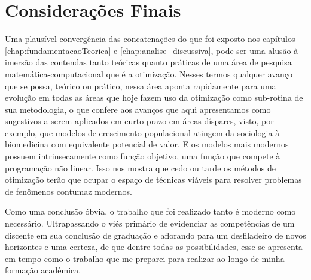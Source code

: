 \section{Considerações Finais}
\label{sec:consideracoesFinais}

Uma plausível convergência das concatenações do que foi exposto nos capítulos
\ref{chap:fundamentacaoTeorica} e \ref{chap:analise_discussiva}, pode ser uma
alusão à imersão das contendas tanto teóricas quanto práticas de uma área de
pesquisa matemática-computacional que é a otimização. Nesses termos qualquer
avanço que se possa, teórico ou prático, nessa área aponta rapidamente para
uma evolução em todas as áreas que hoje fazem uso da otimização como
sub-rotina de sua metodologia, o que confere aos avanços que aqui apresentamos
como sugestivos a serem aplicados em curto prazo em áreas díspares, visto, por
exemplo, que modelos de crescimento populacional atingem da sociologia à
biomedicina com equivalente potencial de valor. E os modelos mais modernos
possuem intrinsecamente como função objetivo, uma função que compete à
programação não linear. Isso nos mostra que cedo ou tarde os métodos de
otimização terão que ocupar o espaço de técnicas viáveis para resolver
problemas de fenômenos contumaz modernos.

Como uma conclusão óbvia, o trabalho que foi realizado tanto é moderno como
necessário. Ultrapassando o viés primário de evidenciar as competências de um
discente em sua conclusão de graduação e aflorando para um desfiladeiro de
novos horizontes e uma certeza, de que dentre todas as possibilidades, esse se
apresenta em tempo como o trabalho que me preparei para realizar ao longo de
minha formação acadêmica.